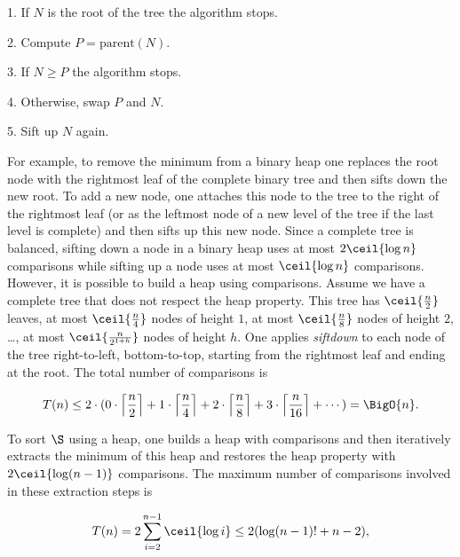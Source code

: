 \begin{algorithm}
\item[1.] If \(N\) is the root of the tree the algorithm stops.
\item[2.] Compute \(P = \text{parent}(N)\).
\item[3.] If \(N \ge P\) the algorithm stops.
\item[4.] Otherwise, swap \(P\) and \(N\).
\item[5.] Sift up \(N\) again.
\end{algorithm}

For example, to remove the minimum from a binary heap one replaces the root
node with the rightmost leaf of the complete binary tree and then sifts down
the new root. To add a new node, one attaches this node to the tree to the
right of the rightmost leaf (or as the leftmost node of a new level
of the tree if the last level is complete) and then sifts up this new node.
Since a complete tree is balanced, sifting down a node in a binary heap uses
at most \(2 \ceil{\log n}\) comparisons while sifting up a node uses at most
\(\ceil{\log n}\)
comparisons. However, it is possible to build a heap using 
comparisons. Assume we have a complete tree that does not respect the heap
property. This tree has \(\ceil{\frac{n}{2}}\) leaves, at most
\(\ceil{\frac{n}{4}}\) nodes of height \(1\), at most \(\ceil{\frac{n}{8}}\)
nodes of height \(2\), \dots, \ie at most \(\ceil{\frac{n}{2^{1+h}}}\) nodes
of height \(h\).
One applies \emph{siftdown} to each node of the tree right-to-left,
bottom-to-top, starting from the rightmost leaf and ending at the root. The
total number of comparisons is

\begin{displaymath}
T(n) \le 2 \cdot ( 0 \cdot \left\lceil\frac{n}{2}\right\rceil + 1 \cdot
\left\lceil\frac{n}{4}\right\rceil + 2 \cdot
\left\lceil\frac{n}{8}\right\rceil + 3 \cdot \left\lceil\frac{n}{16}\right\rceil + \cdots ) = \BigO{n}.
\end{displaymath}

To sort \(\S\) using a heap, one builds a heap with  comparisons and
then iteratively extracts the minimum of this heap and restores the heap
property with \(2\ceil{\log (n-1)}\) comparisons. The maximum number of
comparisons involved in these extraction steps is

\begin{displaymath}
T(n) = 2 \sum_{i=2}^{n-1} \ceil{\log i} \le 2 ( \log (n-1)! + n - 2 ),
\end{displaymath}

